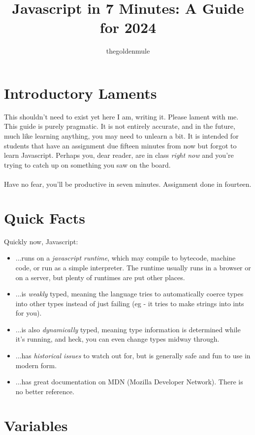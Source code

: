 \documentclass{article}
\title{Javascript in 7 Minutes: A Guide for 2024}
\author{thegoldenmule}
\begin{document}
\maketitle\tableofcontents

\newpage
\section{Introductory Laments}

This shouldn't need to exist yet here I am, writing it. Please lament with me. This guide is purely pragmatic. It is not entirely accurate, and in the future, much like learning anything, you may need to unlearn a bit. It is intended for students that have an assignment due fifteen minutes from now but forgot to learn Javascript. Perhaps you, dear reader, are in class \textit{right now} and you're trying to catch up on something you saw on the board.
\\
\\
Have no fear, you'll be productive in seven minutes. Assignment done in fourteen.

\section{Quick Facts}

Quickly now, Javascript:\\

\begin{itemize}
	\item ...runs on a \textit{javascript runtime}, which may compile to bytecode, machine code, or run as a simple interpreter. The runtime usually runs in a browser or on a server, but plenty of runtimes are put other places.
	\item ...is \textit{weakly} typed, meaning the language tries to automatically coerce types into other types instead of just failing (eg - it tries to make strings into ints for you).
	\item ...is also \textit{dynamically} typed, meaning type information is determined while it's running, and heck, you can even change types midway through.
	\item ...has \textit{historical issues} to watch out for, but is generally safe and fun to use in modern form.
	\item ...has great documentation on MDN (Mozilla Developer Network). There is no better reference.
\end{itemize}

\section{Variables}
\end{document}
